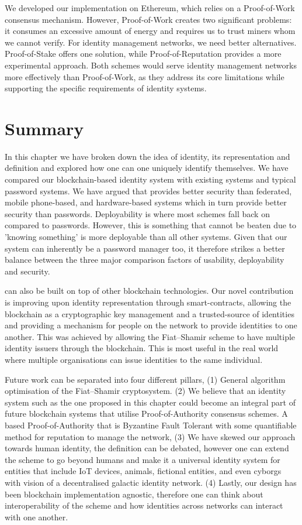 We developed our implementation on Ethereum, which relies on a Proof-of-Work consensus mechanism. However, Proof-of-Work creates two significant problems: it consumes an excessive amount of energy and requires us to trust miners whom we cannot verify. For identity management networks, we need better alternatives. Proof-of-Stake offers one solution, while Proof-of-Reputation \cite{zhuang_proofofwork_2019} provides a more experimental approach. Both schemes would serve identity management networks more effectively than Proof-of-Work, as they address its core limitations while supporting the specific requirements of identity systems.

\section{Summary}
\label{sec::deeid::summary}

In this chapter we have broken down the idea of identity, its representation and definition and explored how one can one uniquely identify themselves. We have compared our blockchain-based identity system with existing systems and typical password systems. We have argued that \deeid provides better security than federated, mobile phone-based, and hardware-based systems which in turn provide better security than passwords. Deployability is where most schemes fall back on compared to passwords. However, this is something that cannot be beaten due to 'knowing something' is more deployable than all other systems. Given that our system can inherently be a password manager too, it therefore strikes a better balance between the three major comparison factors of usability, deployability and security.

\deeid can also be built on top of other blockchain technologies. Our novel contribution is improving upon identity representation through smart-contracts, allowing the blockchain as a cryptographic key management and a trusted-source of identities and providing a mechanism for people on the network to provide identities to one another. This was achieved by allowing the Fiat--Shamir scheme to have multiple identity issuers through the blockchain. This is most useful in the real world where multiple organisations can issue identities to the same individual.

Future work can be separated into four different pillars, (1) General algorithm optimisation of the Fiat--Shamir cryptosystem. (2) We believe that an identity system such as the one proposed in this chapter could become an integral part of future blockchain systems that utilise Proof-of-Authority consensus schemes. A \deeid based Proof-of-Authority that is Byzantine Fault Tolerant with some quantifiable method for reputation to manage the network, (3) We have skewed our approach towards human identity, the definition can be debated, however one can extend the scheme to go beyond humans and make it a universal identity system for entities that include IoT devices, animals, fictional entities, and even cyborgs with vision of a decentralised galactic identity network. (4) Lastly, our design has been blockchain implementation agnostic, therefore one can think about interoperability of the scheme and how identities across networks can interact with one another.
